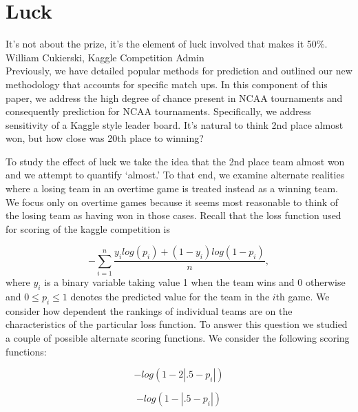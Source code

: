 
\section{Luck}
\noindent It's not about the prize, it's the element of luck involved that makes it 50\%.\\
\noindent  William Cukierski, Kaggle Competition Admin \\

Previously, we have detailed popular methods for prediction and outlined our new methodology that accounts for specific match ups. In this component of this paper, we address the high degree of chance present in NCAA tournaments and consequently prediction for NCAA tournaments.  Specifically, we address sensitivity of a Kaggle style leader board. It's natural to think 2nd place almost won, but how close was 20th place to winning? 


To study the effect of luck we take the idea that the 2nd place team almost won and we attempt to quantify `almost.' To that end, we examine alternate realities where a losing team in an overtime game is treated instead as a winning team. We focus only on overtime games because it seems most reasonable to think of the losing team as having won in those cases. Recall that the loss function used for scoring of the kaggle competition is

\begin{equation}
-\sum_{i=1}^n\frac{y_ilog(p_i)+ (1-y_i)log(1-p_i)}{n},
\end{equation}
where $y_i$ is a binary variable taking value 1 when the team wins and 0 otherwise and $0 \leq p_i \leq 1$ denotes the predicted value for the team in the $i$th game. We consider how dependent the rankings of individual teams are on the characteristics of the particular loss function. To answer this question we studied a couple of possible alternate scoring functions. We consider the following scoring functions: 
 
\begin{equation}\label{eqn:first_score_function}
-log(1-2|.5-p_i|)
\end{equation} 

\begin{equation}\label{eqn:second_score_function}
-log(1-|.5-p_i|)
\end{equation} 

